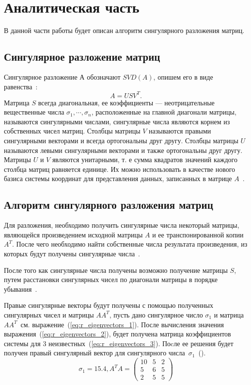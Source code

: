\chapter{Аналитическая часть}
В данной части работы будет описан алгоритм сингулярного разложения матриц.






\section{Сингулярное разложение матриц}
Сингулярное разложение $А$ обозначают $SVD(A)$, опишем его в виде равенства~\cite{SVD}:
\begin{equation}
	A = USV^{T}.
	\label{eq:SVD_def}
\end{equation}
Матрица $S$ всегда диагональная, ее коэффициенты –-- неотрицательные вещественные числа $\sigma_{1}, \cdots, \sigma_{n}$, расположенные на главной диагонали матрицы, называются сингулярными числами, сингулярные числа являются корнем из собственных чисел матриц.
Столбцы матрицы $V$ называются правыми сингулярными векторами и всегда ортогональны 
друг другу.
Столбцы матрицы $U$ называются левыми сингулярными векторами и также ортогональны друг другу. Матрицы $U$ и $V$ являются унитарными, т. е сумма квадратов значений каждого столбца матриц равняется единице.
Их можно использовать в качестве нового базиса системы координат для представления данных, записанных в матрице $A$~\cite{SVD}.

\section{Алгоритм сингулярного разложения матриц}
Для разложения, необходимо получить сингулярные числа некоторый матрицы, являющейся  произведением исходной матрицы $A$ и ее транспонированной копии $A^{T}$.
После чего необходимо найти собственные числа результата произведения, из которых будут получены сингулярные числа~\cite{SVD,pers_val}.

После того как сингулярные числа получены возможно получение матрицы $S$, путем расстановки сингулярных чисел по диагонали матрицы в порядке убывания~\cite{SVD_algo}.

Правые сингулярные векторы будут получены с помощью полученных сингулярных чисел и матрицы $AA^{T}$, пусть дано сингулярное число $\sigma_{1}$ и матрица $AA^{T}$~см. выражение~(\ref{eq:r_eigenvectors_1}).
После вычисления значения выражения~(\ref{eq:r_eigenvectors_2}), будет получена матрица коэффициентов системы для 3 неизвестных~(\ref{eq:r_eigenvectors_3}).
Поcле ее решения будет получен правый сингулярный вектор для сингулярного числа~$\sigma_{1}$~(\cite{SVD_algo}).
\begin{equation}
	\sigma_{1}=15.4, A^{T}A=\begin{pmatrix}
	10 & 5 & 2\\ 
	5 & 6  &5\\
		2 & 5 & 5
	\end{pmatrix}
	\label{eq:r_eigenvectors_1}
\end{equation}


